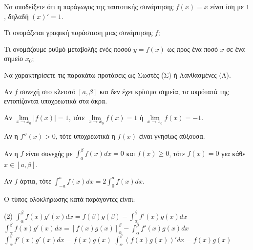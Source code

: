\documentclass[11pt,a4paper]{article}
\newcommand{\kerkissans}[1]{{\fontfamily{maksf}\selectfont \textbf{#1}}}
\renewcommand{\textdexiakeraia}{}
\newcommand{\dint}{\displaystyle\int}
\newcommand\themanum{A}
\newcounter{thema}[section]
\renewcommand{\thethema}{\arabic{thema}}
\newcommand{\Thema}{\refstepcounter{thema}{\textbf{\textcolor{black}{\faPenSquare\ \  \large \kerkissans{\textbf{\thethemaο\hspace{2mm}Διαγώνισμα - Θέμα \themanum}}}}}\hspace{0mm}}{}
\newenvironment{thema}[1]
{\begin{tcolorbox}[title=\Thema\kerkissans{\textbf{\large{  #1}}},breakable,
enhanced standard,titlerule=0pt,toprule=0pt, rightrule=0pt, bottomrule=0pt,
colback=white,left=0mm,top=1mm,bottom=0mm,
boxrule=0pt,
colframe=white,leftrule=0mm,sharp corners,coltitle=black]
\renewcommand{\themanum}{#1}}
{\end{tcolorbox}}
\begin{document}
\begin{thema}{A}
\begin{erwthma}
    \item Να αποδείξετε ότι η παράγωγος της ταυτοτικής συνάρτησης $f(x) = x$ είναι ίση με $1$, δηλαδή $(x)' = 1$.
    \item Τι ονομάζεται γραφική παράσταση μιας συνάρτησης $f$;
    \item Τι ονομάζουμε ρυθμό μεταβολής ενός ποσού $y=f(x)$ ως προς ένα ποσό $x$ σε ένα σημείο $x_0$;
    \item Να χαρακτηρίσετε τις παρακάτω προτάσεις ως Σωστές (Σ) ή Λανθασμένες (Λ).
    \begin{alist}
        \item Αν $f$ συνεχή στο κλειστό $[a, \beta]$ και δεν έχει κρίσιμα σημεία, τα ακρότατά της εντοπίζονται υποχρεωτικά στα άκρα.
        \item Αν $\lim\limits_{x\to x_0} |f(x)| = 1$, τότε $\lim\limits_{x\to x_0} f(x) = 1$ ή $\lim\limits_{x\to x_0} f(x) = -1$.
        \item Αν η $f''(x) > 0$, τότε υποχρεωτικά η $f(x)$ είναι γνησίως αύξουσα.
        \item Αν η $f$ είναι συνεχής με $\dint_a^\beta f(x) dx = 0$ και $f(x) \ge 0$, τότε $f(x) = 0$ για κάθε $x \in [a, \beta]$.
        \item Αν $f$ άρτια, τότε $\dint_{-a}^a f(x) dx = 2 \dint_0^a f(x) dx$.
    \end{alist}
    \item Ο τύπος ολοκλήρωσης κατά παράγοντες είναι:
    \begin{tasks}[label=\let\textdexiakeraia\relax\alph*.](2)
        \task $\dint_\alpha^\beta f(x)g'(x) dx = f(\beta)g(\beta) - \dint_\alpha^\beta f'(x)g(x) dx$
        \task $\dint_\alpha^\beta f(x)g'(x) dx = [f(x)g(x)]_\alpha^\beta - \dint_\alpha^\beta f'(x)g(x) dx$
        \task $\dint_\alpha^\beta f'(x)g'(x) dx = f(x)g(x)$
        \task $\dint_\alpha^\beta (f(x)g(x))' dx = f(x) g(x)$
    \end{tasks}
\end{erwthma}
\end{thema}
\vspace{1cm}
\end{document}
